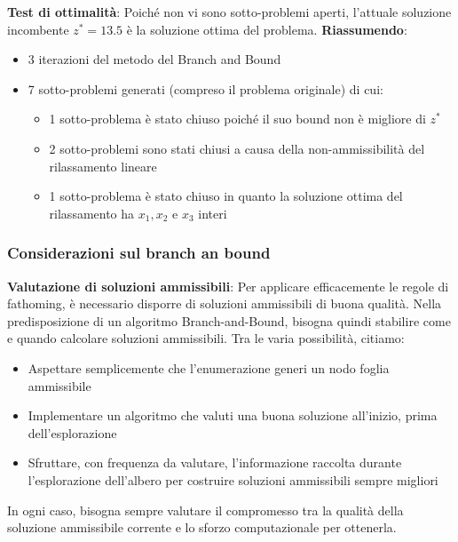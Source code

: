 \documentclass[12pt]{article}
\begin{document}
\textbf{Test di ottimalità}: Poiché non vi sono sotto-problemi aperti, l'attuale soluzione incombente $z^* = 13.5$ è la soluzione ottima del problema. \newline
\textbf{Riassumendo}:
\begin{itemize}
    \item 3 iterazioni del metodo del Branch and Bound 
    \item 7 sotto-problemi generati (compreso il problema originale) di cui:
    \begin{itemize}
        \item 1 sotto-problema è stato chiuso poiché il suo bound non è migliore di $z^*$
        \item 2 sotto-problemi sono stati chiusi a causa della non-ammissibilità del rilassamento lineare
        \item 1 sotto-problema è stato chiuso in quanto la soluzione ottima del rilassamento ha $x_1,x_2$ e $x_3$ interi
    \end{itemize}
\end{itemize}
\subsubsection{Considerazioni sul branch an bound}
\textbf{Valutazione di soluzioni ammissibili}:
Per applicare efficacemente le regole di fathoming, è necessario disporre di soluzioni ammissibili di buona qualità.
Nella predisposizione di un algoritmo Branch-and-Bound, bisogna quindi stabilire come e quando calcolare soluzioni ammissibili.
Tra le varia possibilità, citiamo:
\begin{itemize}
    \item Aspettare semplicemente che l'enumerazione generi un nodo foglia ammissibile
    \item Implementare un algoritmo che valuti una buona soluzione all'inizio, prima dell'esplorazione
    \item Sfruttare, con frequenza da valutare, l'informazione raccolta durante l'esplorazione dell'albero per costruire soluzioni ammissibili sempre migliori
\end{itemize}
In ogni caso, bisogna sempre valutare il compromesso tra la qualità della soluzione ammissibile corrente e lo sforzo computazionale per ottenerla.
\end{document}

